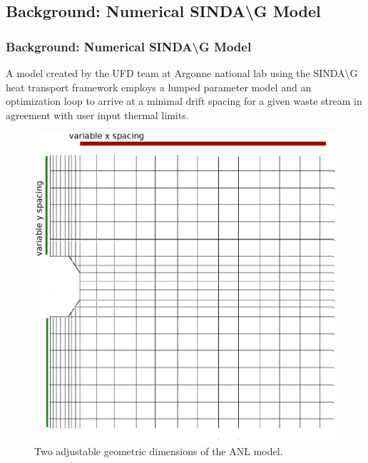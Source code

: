 

\subsection{Background: Numerical SINDA{\textbackslash}G Model}

\begin{frame}[ctb!]
  \frametitle{Background: Numerical SINDA{\textbackslash}G Model}
  A model created by the UFD team at Argonne national lab using the 
  SINDA{\textbackslash}G heat transport framework employs a lumped parameter 
  model and an optimization loop to arrive at a minimal drift spacing for a 
  given waste stream in agreement with user input thermal limits. 
  \begin{figure}[h!]
    \begin{center}
      \includegraphics[height=.5\textheight]{sindageom.eps}
    \end{center}
    \caption{Two adjustable geometric dimensions of the ANL model.} 
    \label{fig:sindageom}
  \end{figure}
\end{frame}


